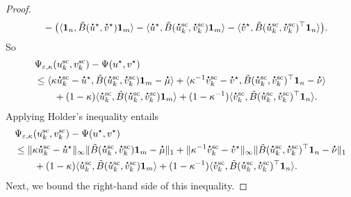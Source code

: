 \begin{proof}
\begin{align*}
&\qquad - \big(\inr{\mathbf 1_n, \tilde{B}(\dt{u}^{\star} ,\dt{v}^{\star})\mathbf 1_m}  
- \inr{\dt{u}^{\star{}}, \tilde{B}(\dt{u}^{\text{sc}}_k ,\dt{v}^{\text{sc}}_k)\mathbf 1_m} 
- \inr{\dt{v}^\star, \tilde{B}(\dt{u}^{\text{sc}}_k ,\dt{v}^{\text{sc}}_k)^\top \mathbf 1_n} \big).
\end{align*}
So
\begin{align*}
&\Psi_{\varepsilon, \kappa} (u^{\text{sc}}_k ,v^{\text{sc}}_k) -\Psi(u^\star, v^\star)\\
&\leq  \inr{\kappa \dt{u}^{\text{sc}}_k - \dt{u}^{\star}, \tilde{B}(\dt{u}^{\text{sc}}_k ,\dt{v}^{\text{sc}}_k)\mathbf 1_m - \dt{\mu}} +\inr{\kappa^{-1}\dt{v}^{\text{sc}}_k - \dt{v}^{\star}, \tilde{B}(\dt{u}^{\text{sc}}_k ,\dt{v}^{\text{sc}}_k)^\top\mathbf 1_n - \dt{\nu}}\\
&\qquad + (1- \kappa)\inr{\dt{u}^{\text{sc}}_k ,\tilde{B}(\dt{u}^{\text{sc}}_k ,\dt{v}^{\text{sc}}_k)\mathbf 1_m} + (1- \kappa^{-1})\inr{\dt{v}^{\text{sc}}_k ,\tilde{B}(\dt{u}^{\text{sc}}_k ,\dt{v}^{\text{sc}}_k)^\top\mathbf 1_n}.
\end{align*}
Applying Holder's inequality entails
\begin{align*}
&\Psi_{\varepsilon, \kappa}(u^{\text{sc}}_k ,v^{\text{sc}}_k) -\Psi(u^\star, v^\star)\\
&\leq \norm{\kappa \dt{u}^{\text{sc}}_k - \dt{u}^\star}_\infty \norm{\tilde{B}(\dt{u}^{\text{sc}}_k ,\dt{v}^{\text{sc}}_k)\mathbf 1_m - \dt{\mu}}_1 + \norm{\kappa^{-1}\dt{v}^{\text{sc}}_k - \dt{v}^\star}_\infty \norm{\tilde{B}(\dt{u}^{\text{sc}}_k ,\dt{v}^{\text{sc}}_k)^\top\mathbf 1_n - \dt{\nu}}_1\\
&\qquad + (1- \kappa)\inr{\dt{u}^{\text{sc}}_k ,\tilde{B}(\dt{u}^{\text{sc}}_k ,\dt{v}^{\text{sc}}_k)\mathbf 1_m} + (1- \kappa^{-1})\inr{\dt{v}^{\text{sc}}_k ,\tilde{B}(\dt{u}^{\text{sc}}_k ,\dt{v}^{\text{sc}}_k)^\top\mathbf 1_n}.
\end{align*}
Next, we bound the right-hand side of this inequality.


\end{proof}
